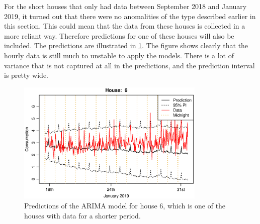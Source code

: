 \noindent For the short houses that only had data between September 2018 and January 2019, it turned out that there were no anomalities of the type described earlier in this section. This could mean that the data from these houses is collected in a more reliant way. Therefore predictions for one of these houses will also be included. The predictions are illustrated in \cref{fig:arima2_pred_6}. The figure shows clearly that the hourly data is still much to unstable to apply the models. There is a lot of variance that is not captured at all in the predictions, and the prediction interval is pretty wide.
\begin{figure}[ht]
    \centering
    \includegraphics[width=0.8\textwidth]{../../../figures/Pred14days6.eps}
    \caption{Predictions of the ARIMA model for house 6, which is one of the houses with data for a shorter period.}
    \label{fig:arima2_pred_6}
\end{figure}


